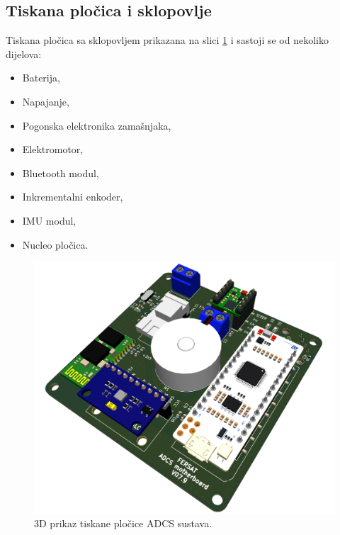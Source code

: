 \documentclass[times, utf8, diplomski, numeric]{templates/template}
\begin{document}
{{        \subsection{Tiskana pločica i sklopovlje}{
            Tiskana pločica sa sklopovljem prikazana na slici \ref{fig:plocica_3d} i sastoji se od nekoliko dijelova:

            \begin{itemize}
            \item Baterija,
            \item Napajanje,
            \item Pogonska elektronika zamašnjaka,
            \item Elektromotor,
            \item Bluetooth modul,
            \item Inkrementalni enkoder,
            \item IMU modul,
            \item Nucleo pločica.
            \end{itemize}

            \begin{figure}[htb]
            \centering
            \includegraphics[width=1.0\textwidth]{images/plocica_3d.png}
            \caption{3D prikaz tiskane pločice ADCS sustava.}
            \label{fig:plocica_3d}
            \end{figure}

}}}
\end{document}
